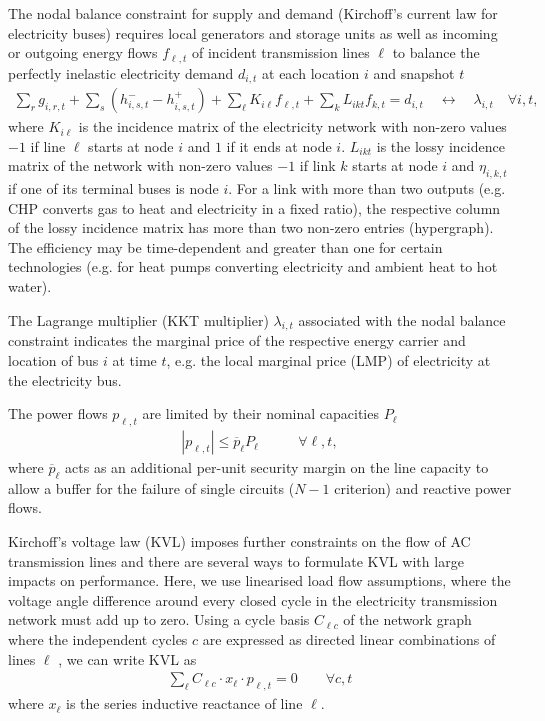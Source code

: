 The nodal balance constraint for supply and demand (Kirchoff's current law for electricity
buses) requires local generators and storage units as well as incoming or
outgoing energy flows $f_{\ell,t}$ of incident transmission lines $\ell$ to
balance the perfectly inelastic electricity demand $d_{i,t}$ at each location
$i$ and snapshot $t$
\begin{align}
    \sum_r g_{i,r,t} + \sum_s \left(h_{i,s,t}^- - h_{i,s,t}^+ \right) + \sum_\ell K_{i\ell} f_{\ell,t} + \sum_k L_{ikt} f_{k,t} = d_{i,t}  \quad \leftrightarrow \quad \lambda_{i,t} \quad \forall i,t,
\end{align}
where $K_{i\ell}$ is the incidence matrix of the electricity network with
non-zero values $-1$ if line $\ell$ starts at node $i$ and $1$ if it ends at
node $i$. $L_{ikt}$ is the lossy incidence matrix of the network with
non-zero values $-1$ if link $k$ starts at node $i$ and $\eta_{i,k,t}$ if one of
its terminal buses is node $i$. For a link with more than two outputs (e.g. CHP
converts gas to heat and electricity in a fixed ratio), the respective column of
the lossy incidence matrix has more than two non-zero entries (hypergraph). The
efficiency may be time-dependent and greater than one for certain technologies
(e.g. for heat pumps converting electricity and ambient heat to hot water).

The Lagrange multiplier (KKT multiplier) $\lambda_{i,t}$ associated with the
nodal balance constraint indicates the marginal price of the respective energy
carrier and location of bus $i$ at time $t$, e.g. the local marginal price (LMP)
of electricity at the electricity bus.

The power flows $p_{\ell,t}$ are limited by their nominal capacities $P_\ell$
\begin{align}
	|p_{\ell,t}| \leq \overline{p}_{\ell} P_{\ell} & \qquad\forall \ell, t,
	\label{eq:cap}
\end{align}
where $\overline{p}_\ell$ acts as an additional per-unit security margin on the line capacity
to allow a buffer for the failure of single circuits ($N-1$ criterion) and reactive power flows.

Kirchoff's voltage law (KVL) imposes further constraints on the flow of AC
transmission lines and there are several ways to formulate KVL with large
impacts on performance. Here, we use linearised load flow assumptions, where the
voltage angle difference around every closed cycle in the electricity
transmission network must add up to zero. Using a cycle basis $C_{\ell c}$ of
the network graph where the independent cycles $c$ are expressed as directed
linear combinations of lines $\ell$ \cite{horschLinearOptimal2018}, we can write
KVL as
\begin{align}
    \sum_\ell C_{\ell c} \cdot x_\ell \cdot p_{\ell,t} = 0 \qquad\forall c,t
    \label{eq:kvl}
\end{align}
where $x_\ell$ is the series inductive reactance of line $\ell$.


